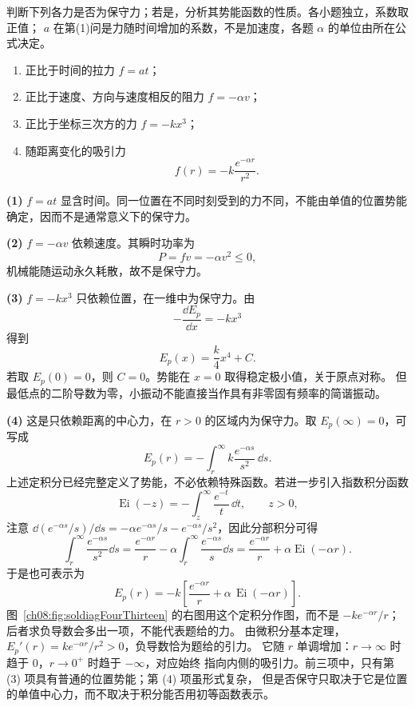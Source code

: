 {
\begin{origexamplebox}{}\label{ch08:ex:s11-4-13}
判断下列各力是否为保守力；若是，分析其势能函数的性质。各小题独立，系数取正值；
$a$ 在第(1)问是力随时间增加的系数，不是加速度，各题 $\alpha$ 的单位由所在公式决定。
\begin{enumerate}[label=\arabic*.,leftmargin=2.2em]
 \item 正比于时间的拉力 $f=a t$；
 \item 正比于速度、方向与速度相反的阻力 $f=-\alpha v$；
 \item 正比于坐标三次方的力 $f=-kx^3$；
 \item 随距离变化的吸引力
 \[
 f(r)=-k\frac{e^{-\alpha r}}{r^2}.
 \]
\end{enumerate}

\ThQConservative
\end{origexamplebox}

\begin{xesolution}
\textbf{(1)} $f=at$ 显含时间。同一位置在不同时刻受到的力不同，不能由单值的位置势能
确定，因而不是通常意义下的保守力。

\textbf{(2)} $f=-\alpha v$ 依赖速度。其瞬时功率为
\[
 P=fv=-\alpha v^2\le0,
\]
机械能随运动永久耗散，故不是保守力。

\textbf{(3)} $f=-kx^3$ 只依赖位置，在一维中为保守力。由
\[
 -\frac{\dd E_p}{\dd x}=-kx^3
\]
得到
\[
 \boxed{E_p(x)=\frac{k}{4}x^4+C}.
\]
若取 $E_p(0)=0$，则 $C=0$。势能在 $x=0$ 取得稳定极小值，关于原点对称。
但最低点的二阶导数为零，小振动不能直接当作具有非零固有频率的简谐振动。

\textbf{(4)} 这是只依赖距离的中心力，在 $r>0$ 的区域内为保守力。取
$E_p(\infty)=0$，可写成
\[
 \boxed{
 E_p(r)=-\int_r^\infty
 k\frac{e^{-\alpha s}}{s^2}\,\dd s}.
\]
上述定积分已经完整定义了势能，不必依赖特殊函数。若进一步引入指数积分函数
\[
 \operatorname{Ei}(-z)=-\int_z^\infty\frac{e^{-t}}{t}\,\dd t,\qquad z>0,
\]
注意 $\dd(e^{-\alpha s}/s)/\dd s=-\alpha e^{-\alpha s}/s-e^{-\alpha s}/s^2$，因此分部积分可得
\[
 \int_r^\infty\frac{e^{-\alpha s}}{s^2}\dd s
 =\frac{e^{-\alpha r}}r-\alpha\int_r^\infty\frac{e^{-\alpha s}}s\dd s
 =\frac{e^{-\alpha r}}r+\alpha\operatorname{Ei}(-\alpha r).
\]
于是也可表示为
\[
 E_p(r)
 =-k\left[
 \frac{e^{-\alpha r}}{r}
 +\alpha\,\operatorname{Ei}(-\alpha r)
 \right].
\]
\soldiagFourThirteen
图~\ref{ch08:fig:soldiagFourThirteen} 的右图用这个定积分作图，而不是 $-ke^{-\alpha r}/r$；后者求负导数会多出一项，不能代表题给的力。
由微积分基本定理，$E_p'(r)=ke^{-\alpha r}/r^2>0$，负导数恰为题给的引力。
它随 $r$ 单调增加：$r\to\infty$ 时趋于 $0$，$r\to0^+$ 时趋于 $-\infty$，对应始终
指向内侧的吸引力。前三项中，只有第 (3) 项具有普通的位置势能；第 (4) 项虽形式复杂，
但是否保守只取决于它是位置的单值中心力，而不取决于积分能否用初等函数表示。
\end{xesolution}

}
